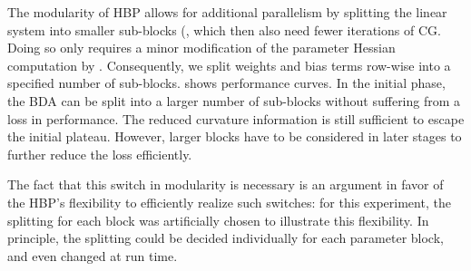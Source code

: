 The modularity of HBP allows for additional parallelism by splitting the linear
system  into smaller sub-blocks
(, which then also need fewer iterations of CG. Doing
so only requires a minor modification of the parameter Hessian computation by
. Consequently, we split weights and bias
terms row-wise into a specified number of sub-blocks.  shows performance curves. In the initial
phase, the BDA can be split into a larger number of sub-blocks without suffering
from a loss in performance. The reduced curvature information is still
sufficient to escape the initial plateau. However, larger blocks have to be
considered in later stages to further reduce the loss efficiently.

The fact that this switch in modularity is necessary is an argument in favor of
the HBP's flexibility to efficiently realize such switches: for this experiment,
the splitting for each block was artificially chosen to illustrate this
flexibility. In principle, the splitting could be decided individually for each
parameter block, and even changed at run time.

